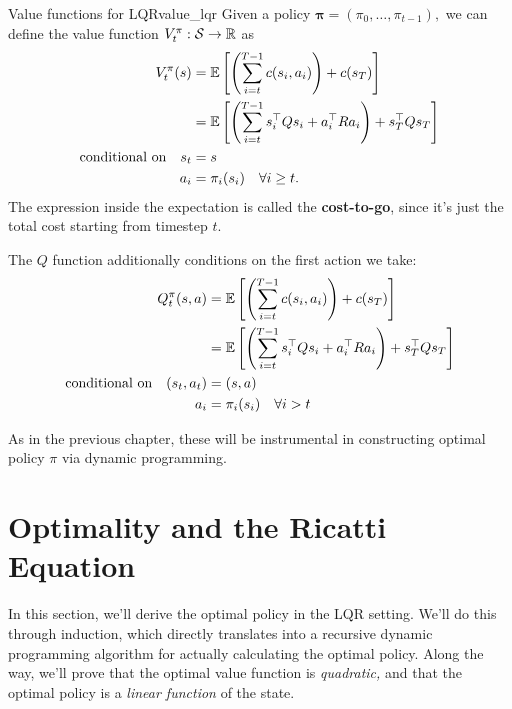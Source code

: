 \documentclass[../main/main]{subfiles}
\begin{document}
\begin{definition}{Value functions for LQR}{value_lqr}
    Given a policy $\mathbf{\pi} = (\pi_0, \dots, \pi_{t-1}),$ we can define the
    value function $V^\pi_t : \mathcal{S} \to \mathbb{R}$ as \[ \begin{split}
        V^\pi_t (s) &= \operatorname*{\mathbb{E}} \left[ \left( \sum_{i=t}^{T-1} c(s_i, a_i) \right) + c(s_T) \right] \\
        &= \operatorname*{\mathbb{E}} \left[ \left( \sum_{i=t}^{T-1} s_i^\top Q s_i + a_i^\top R a_i \right) + s_T^\top Q s_T \right] \\
        \textrm{conditional on} \quad s_t &= s \\
        a_i &= \pi_i(s_i) \quad \forall i \ge t.
    \end{split} \]
    The expression inside the expectation is called the \textbf{cost-to-go},
    since it's just the total cost starting from timestep $t$.

    The $Q$ function additionally conditions on the first
    action we take: \[ \begin{split}
        Q^\pi_t (s, a) &= \operatorname*{\mathbb{E}} \left[ \left( \sum_{i=t}^{T-1} c(s_i, a_i) \right) + c(s_T) \right] \\
        &= \operatorname*{\mathbb{E}} \left[ \left( \sum_{i=t}^{T-1} s_i^\top Q s_i + a_i^\top R a_i \right) + s_T^\top Q s_T \right] \\
        \textrm{conditional on} \quad (s_t, a_t) &= (s, a) \\
        \quad a_i &= \pi_i(s_i) \quad \forall i > t
    \end{split} \]
\end{definition}

As in the previous chapter, these will be instrumental in constructing optimal policy $\pi$ via dynamic
programming.

\section{Optimality and the Ricatti Equation} \label{sec:optimal_lqr}

In this section, we'll derive the optimal policy in the LQR setting.
We'll do this through induction, which directly translates into a recursive dynamic programming algorithm for actually calculating the optimal policy.
Along the way, we'll prove that the optimal value function is \emph{quadratic,}
and that the optimal policy is a \emph{linear function} of the state.
\end{document}

